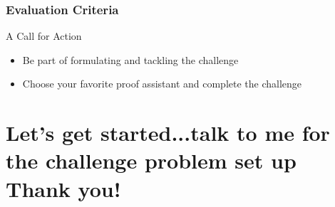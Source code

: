 \documentclass{beamer}
\begin{document}




\begin{frame}
  \frametitle{Evaluation Criteria}
  

\end{frame}


\begin{frame}{A Call for Action}
  \begin{itemize}
  \item Be part of formulating and tackling the challenge
  \item Choose your favorite proof assistant and complete the
    challenge
  \end{itemize}





\end{frame}




  \section{Let's get started...\pause talk to me for the challenge
    problem set up \newline \protect \color{orange}Thank you!}
\end{document}
